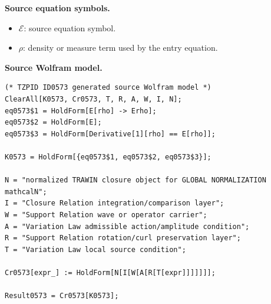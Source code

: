 \begin{minipage}[t]{0.49\linewidth}
\begingroup
\small
\raggedright
\textbf{Source equation symbols.}\par
\begin{itemize}[leftmargin=1.35em,itemsep=1pt,topsep=1pt,parsep=0pt]
    \item $\mathcal{E}$: source equation symbol.
    \item $\rho$: density or measure term used by the entry equation.
\end{itemize}
\endgroup
\end{minipage}\hfill
\begin{minipage}[t]{0.47\linewidth}
\begingroup
\scriptsize
\raggedright
\textbf{Source Wolfram model.}\par
\begin{Verbatim}[fontsize=\tiny,breaklines=true,breakanywhere=true]
(* TZPID ID0573 generated source Wolfram model *)
ClearAll[K0573, Cr0573, T, R, A, W, I, N];
eq0573$1 = HoldForm[E[rho] -> Erho];
eq0573$2 = HoldForm[E];
eq0573$3 = HoldForm[Derivative[1][rho] == E[rho]];

K0573 = HoldForm[{eq0573$1, eq0573$2, eq0573$3}];

N = "normalized TRAWIN closure object for GLOBAL NORMALIZATION mathcalN";
I = "Closure Relation integration/comparison layer";
W = "Support Relation wave or operator carrier";
A = "Variation Law admissible action/amplitude condition";
R = "Support Relation rotation/curl preservation layer";
T = "Variation Law local source condition";

Cr0573[expr_] := HoldForm[N[I[W[A[R[T[expr]]]]]]];

Result0573 = Cr0573[K0573];
\end{Verbatim}
\endgroup
\end{minipage}

